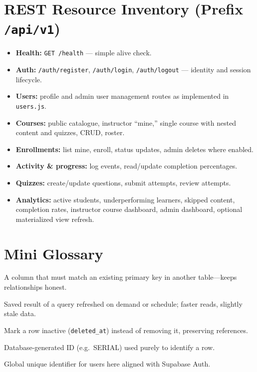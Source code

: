 
\appendix

\chapter{REST Resource Inventory (Prefix \texttt{/api/v1})}
\begin{itemize}[leftmargin=*]
  \item \textbf{Health:} \texttt{GET /health} --- simple alive check.

  \item \textbf{Auth:} \texttt{/auth/register}, \texttt{/auth/login}, \texttt{/auth/logout} --- identity and session lifecycle.

  \item \textbf{Users:} profile and admin user management routes as implemented in \texttt{users.js}.

  \item \textbf{Courses:} public catalogue, instructor ``mine,'' single course with nested content and quizzes, CRUD, roster.

  \item \textbf{Enrollments:} list mine, enroll, status updates, admin deletes where enabled.

  \item \textbf{Activity \& progress:} log events, read/update completion percentages.

  \item \textbf{Quizzes:} create/update questions, submit attempts, review attempts.

  \item \textbf{Analytics:} active students, underperforming learners, skipped content, completion rates, instructor course dashboard, admin dashboard, optional materialized view refresh.

\end{itemize}

\chapter{Mini Glossary}
\begin{description}[style=nextline]
  \item[Foreign key]
  A column that must match an existing primary key in another table---keeps relationships honest.

  \item[Materialized view]
  Saved result of a query refreshed on demand or schedule; faster reads, slightly stale data.

  \item[Soft delete]
  Mark a row inactive (\texttt{deleted\_at}) instead of removing it, preserving references.

  \item[Surrogate key]
  Database-generated ID (e.g.\ SERIAL) used purely to identify a row.

  \item[UUID]
  Global unique identifier for users here aligned with Supabase Auth.

\end{description}

